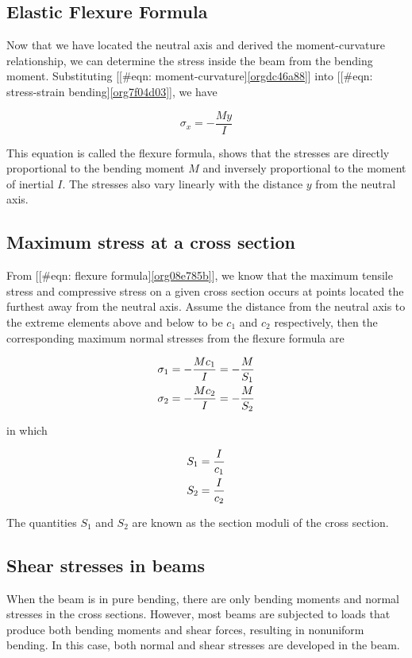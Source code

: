 \documentclass[a4paper,openany,12pt]{book}
\begin{document}
\subsection{Elastic Flexure Formula}
\label{sec:org6ebb1f8}
Now that we have located the neutral axis and derived the
moment-curvature relationship, we can determine the stress inside the
beam from the bending moment. Substituting
[[\#eqn: moment-curvature]\ref{orgdc46a88}] into
[[\#eqn: stress-strain bending]\ref{org7f04d03}], we have

$$ \sigma_x =  - \frac{My}{I}$$

This equation is called the flexure formula, shows that the stresses are
directly proportional to the bending moment \(M\) and inversely
proportional to the moment of inertial \(I\). The stresses also vary
linearly with the distance \(y\) from the neutral axis.

\subsection{Maximum stress at a cross section}
\label{sec:orgedc9e82}
From [[\#eqn: flexure formula]\ref{org08e785b}], we know that the
maximum tensile stress and compressive stress on a given cross section
occurs at points located the furthest away from the neutral axis. Assume
the distance from the neutral axis to the extreme elements above and
below to be \(c_1\) and \(c_2\) respectively, then the corresponding maximum
normal stresses from the flexure formula are

\begin{gather}
\label{eq:orgbdfeb43}
  \sigma _1 =  - \frac{Mc_1}{I} =  - \frac{M}{S_1} \hfill \\
  \sigma _2 =  - \frac{Mc_2}{I} =  - \frac{M}{S_2} \hfill \\ 
\end{gather}

in which

$$\begin{gathered}
  S_1 = \frac{I}{c_1} \hfill \\
  S_2 = \frac{I}{c_2} \hfill \\ 
\end{gathered}$$

The quantities \(S_1\) and \(S_2\) are known as the section moduli of the
cross section.

\subsection{Shear stresses in beams}
\label{sec:org9a015ac}
When the beam is in pure bending, there are only bending moments and
normal stresses in the cross sections. However, most beams are subjected
to loads that produce both bending moments and shear forces, resulting
in nonuniform bending. In this case, both normal and shear stresses are
developed in the beam.
\end{document}
